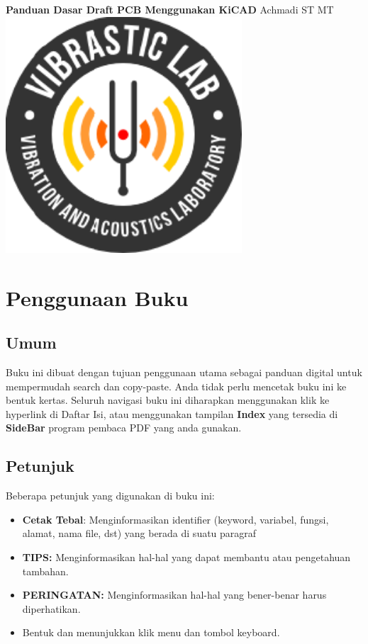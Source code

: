 \documentclass[12pt]{book}
\date{}
\begin{document}
	\frontmatter
	\begin{titlepage}
		\centering
		{\LARGE \bf Panduan Dasar Draft PCB Menggunakan KiCAD}
		\vfill
		{\Large Achmadi ST MT}
		\vfill
		\includegraphics[width=250pt]{images/logo/logoviblab}
		\vfill
		\vfill
	\end{titlepage}


	\newpage
	\tableofcontents
	\listoffigures
	\listoftables



	\newpage
	\chapter{Penggunaan Buku}

	\section{Umum}
	Buku ini dibuat dengan tujuan penggunaan utama sebagai panduan digital untuk mempermudah search dan copy-paste.
	Anda tidak perlu mencetak buku ini ke bentuk kertas.
	Seluruh navigasi buku ini diharapkan menggunakan klik ke hyperlink di Daftar Isi,
	atau menggunakan tampilan \textbf{Index} yang tersedia di \textbf{SideBar} program pembaca PDF yang anda gunakan.

	\section{Petunjuk}
	Beberapa petunjuk yang digunakan di buku ini:
	\begin{itemize}
		\item \textbf{Cetak Tebal}: Menginformasikan identifier (keyword, variabel, fungsi, alamat, nama file, dst) yang berada di suatu paragraf
		\item \textbf{TIPS:} Menginformasikan hal-hal yang dapat membantu atau pengetahuan tambahan.
		\item \textbf{PERINGATAN:} Menginformasikan hal-hal yang bener-benar harus diperhatikan.
		\item Bentuk  dan  menunjukkan klik menu dan tombol keyboard.
	\end{itemize}
\end{document}
